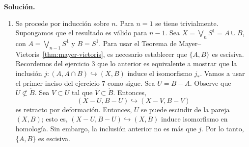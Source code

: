 \documentclass[11pt,a4paper]{article}
\theoremstyle{plain}
\theoremstyle{definition}
\theoremstyle{remark}
\begin{document}
\begin{enumerate}[label=\arabic*.,leftmargin=*]
\noindent\textbf{Solución.}
\begin{enumerate}[label=\alph*)]
\item Se procede por inducción sobre $n$. Para $n=1$ se tiene trivialmente.
Supongamos que el resultado es válido para $n-1$. Sea $X=\bigvee_nS^1=A\cup B$,
con $A=\bigvee_{n-1}S^1$ y $B=S^1$. Para usar el Teorema de
Mayer--Vietoris~\ref{thm:mayer-vietoris}, es necesario establecer que
$\{A,B\}$ es escisiva. Recordemos del ejercicio 3 que lo anterior es
equivalente a mostrar que la inclusión $j:(A,A\cap B)\hookrightarrow(X,B)$
induce el isomorfismo $j_*$. Vamos a usar el primer inciso del ejercicio 7
como sigue. Sea $U=B-A$. Observe que $\overline U\not\subset\mathring B$.
Sea $V\subset U$ tal que $\overline V\subset\mathring B$. Entonces,
\[
(X-U,B-U)\hookrightarrow(X-V,B-V)
\]
es retracto por deformación. Entonces, $U$ se puede escindir de la pareja
$(X,B)$; esto es, $(X-U,B-U)\hookrightarrow(X,B)$ induce isomorfismo en
homología. Sin embargo, la inclusión anterior no es más que $j$. Por lo
tanto, $\{A,B\}$ es escisiva.


\end{enumerate}
\end{enumerate}
\end{document}
